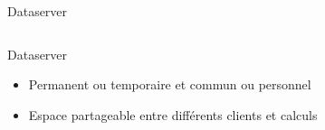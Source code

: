 \documentclass{beamer}
\begin{document}
\begin{frame}{Dataserver}
\begin{columns}
\begin{column}[r]{0.5\linewidth}
\begin{exampleblock}{Dataserver}
\begin{itemize}
             \item Permanent ou temporaire et commun ou personnel
             \item Espace partageable entre différents clients et calculs
            \end{itemize}
            
        \end{exampleblock}
        
	\end{column}
	\end{columns}
    
\end{frame}
%
%    
\end{document}
